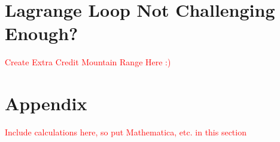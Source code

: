 \documentclass[12pt]{article}   %
\theoremstyle{definition}
\numberwithin{equation}{section}
\begin{document}
\section{Lagrange Loop Not Challenging Enough?} \label{APPM2350proj02sec07}

\textcolor{red}{Create Extra Credit Mountain Range Here :)}

\section{Appendix} \label{APPM2350proj02sec08}

\textcolor{red}{Include calculations here, so put Mathematica, etc. in this section}

\end{document}
